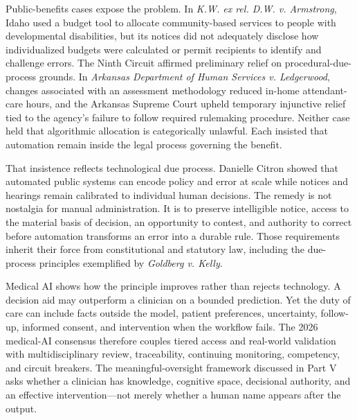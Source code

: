 Public-benefits cases expose the problem. In \emph{K.W. ex rel. D.W. v. Armstrong}, Idaho used a budget tool to allocate community-based services to people with developmental disabilities, but its notices did not adequately disclose how individualized budgets were calculated or permit recipients to identify and challenge errors. The Ninth Circuit affirmed preliminary relief on procedural-due-process grounds. In \emph{Arkansas Department of Human Services v. Ledgerwood}, changes associated with an assessment methodology reduced in-home attendant-care hours, and the Arkansas Supreme Court upheld temporary injunctive relief tied to the agency's failure to follow required rulemaking procedure. Neither case held that algorithmic allocation is categorically unlawful. Each insisted that automation remain inside the legal process governing the benefit.

That insistence reflects technological due process. Danielle Citron showed that automated public systems can encode policy and error at scale while notices and hearings remain calibrated to individual human decisions. The remedy is not nostalgia for manual administration. It is to preserve intelligible notice, access to the material basis of decision, an opportunity to contest, and authority to correct before automation transforms an error into a durable rule. Those requirements inherit their force from constitutional and statutory law, including the due-process principles exemplified by \emph{Goldberg v. Kelly}.

Medical AI shows how the principle improves rather than rejects technology. A decision aid may outperform a clinician on a bounded prediction. Yet the duty of care can include facts outside the model, patient preferences, uncertainty, follow-up, informed consent, and intervention when the workflow fails. The 2026 medical-AI consensus therefore couples tiered access and real-world validation with multidisciplinary review, traceability, continuing monitoring, competency, and circuit breakers. The meaningful-oversight framework discussed in Part V asks whether a clinician has knowledge, cognitive space, decisional authority, and an effective intervention---not merely whether a human name appears after the output.

